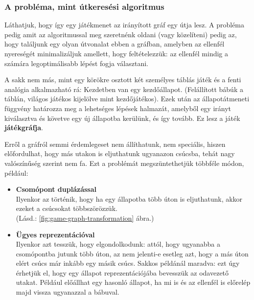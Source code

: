 \documentclass[twoside, a4paper, 12pt]{article}
\begin{document}
\subsubsection{A probléma, mint útkeresési algoritmus}
Láthatjuk, hogy így egy játékmenet az irányított gráf egy útja lesz. A probléma pedig amit az algoritmussal meg szeretnénk oldani (vagy közelíteni) pedig az, hogy találjunk egy olyan útvonalat ebben a gráfban, amelyben az ellenfél nyereségét minimalizáljuk amellett, hogy feltételezzük: az ellenfél mindig a számára legoptimálisabb lépést fogja választani.

A sakk nem más, mint egy körökre osztott két személyes táblás játék és a fenti analógia alkalmazható rá: Kezdetben van egy kezdőállapot. (Felállított bábúk a táblán, világos játékos kijelölve mint kezdőjátékos). Ezek után az állapotátmeneti függvény határozza meg a lehetséges lépések halmazát, amelyből egy irányt kiválasztva és követve egy új állapotba kerülünk, és így tovább. Ez lesz a játék \textbf{játékgráfja}.

Erről a gráfról semmi érdemlegeset nem állíthatunk, nem speciális, hiszen előfordulhat, hogy más utakon is eljuthatunk ugyanazon csúcsba, tehát nagy valószínűség szerint nem fa. Ezt a problémát megszüntethetjük többféle módon, például: 

\begin{itemize}
	\item \textbf{Csomópont duplázással} \\
	Ilyenkor az történik, hogy ha egy állapotba több úton is eljuthatunk, akkor ezeket a csúcsokat többszörözzük. \\
	(Lásd.: \ref{fig:game-graph-transformation} ábra.)
	
	\item \textbf{Ügyes reprezentációval} \\
	Ilyenkor azt tesszük, hogy elgondolkodunk: attól, hogy ugyanabba a csomópontba jutunk több úton, az nem jelenti-e esetleg azt, hogy a más úton elért csúcs már inkább egy másik csúcs. Sakkos példánál maradva: ezt úgy érhetjük el, hogy egy állapot reprezentációjába bevesszük az odavezető utakat. Például előállhat egy hasonló állapot, ha mi is és az ellenfél is előrelép majd vissza ugyanazzal a bábuval.
\end{itemize}
\end{document}
